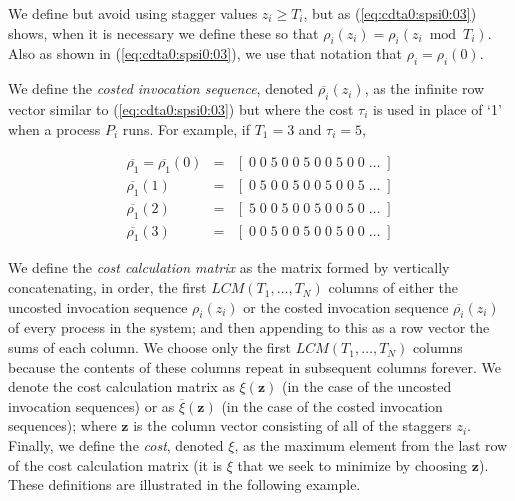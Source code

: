 \noindent{}We define but avoid using stagger values $z_i \geq T_i$, but as
(\ref{eq:cdta0:spsi0:03}) shows, when it is necessary we define these so that
$\rho_i(z_i) = \rho_i(z_i \bmod T_i)$.  Also as shown in (\ref{eq:cdta0:spsi0:03}),
we use that notation
that $\rho_i = \rho_i(0)$. 

We define the \emph{costed invocation sequence}, denoted 
$\overline{\rho_i}(z_i)$, as the infinite row
vector similar to (\ref{eq:cdta0:spsi0:03}) but where
the cost $\tau_i$ is used in place of `1' when a process $P_i$ runs.
For example, if $T_1=3$ and $\tau_i = 5$,

\begin{eqnarray}
\nonumber
\overline{\rho_1} = 
\overline{\rho_1}(0) & = & [ \; 0 \; 0 \; 5 \; 0 \; 0 \; 5 \; 0 \; 0 \; 5 \; 0 \; 0 \; \ldots \; ] \\
\label{eq:cdta0:spsi0:04}
\overline{\rho_1}(1) & = & [ \; 0 \; 5 \; 0 \; 0 \; 5 \; 0 \; 0 \; 5 \; 0 \; 0 \; 5 \; \ldots \; ] \\
\nonumber
\overline{\rho_1}(2) & = & [ \; 5 \; 0 \; 0 \; 5 \; 0 \; 0 \; 5 \; 0 \; 0 \; 5 \; 0 \; \ldots \; ] \\
\nonumber
\overline{\rho_1}(3) & = & [ \; 0 \; 0 \; 5 \; 0 \; 0 \; 5 \; 0 \; 0 \; 5 \; 0 \; 0 \; \ldots \; ]
\end{eqnarray}

We define the \emph{cost calculation matrix} as the matrix formed by vertically
concatenating, in order, the first $LCM(T_1, \ldots , T_N)$ 
columns of either the uncosted invocation sequence
$\rho_i(z_i)$ or the costed invocation sequence $\overline{\rho_i}(z_i)$
of every process in the system; and then appending to this as a row vector
the sums of 
each column.  We choose only the first $LCM(T_1, \ldots , T_N)$ columns
because the contents of these columns repeat in subsequent columns forever.
We denote the cost calculation matrix as $\xi(\mathbf{z})$ (in the case
of the uncosted invocation sequences) or as $\overline{\xi}(\mathbf{z})$
(in the case of the costed invocation sequences); where $\mathbf{z}$ is the
column vector consisting of all of the staggers $z_i$.  Finally, we define the 
\emph{cost}, denoted $\xi$, as the maximum element from the last row of the 
cost calculation matrix (it is $\xi$ that we seek to minimize by choosing
$\mathbf{z}$).  These definitions are illustrated in the following example.

